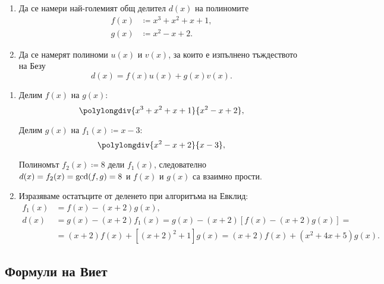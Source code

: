 \documentclass[numbers=endperiod, DIV=15, bibliography=totocnumbered]{scrartcl}
\begin{document}
\begin{exercise}
  \mbox{}
  \begin{enumerate}
    \item Да се намери най-големият общ делител $d(x)$ на полиномите
    \begin{align*}
      f(x) &\coloneqq x^3 + x^2 + x + 1, \\
      g(x) &\coloneqq x^2 - x + 2.
    \end{align*}

    \item Да се намерят полиноми $u(x)$ и $v(x)$, за които е изпълнено тъждеството на Безу
    \begin{displaymath}
      d(x) = f(x) u(x) + g(x) v(x).
    \end{displaymath}
  \end{enumerate}
\end{exercise}
\begin{solution}
  \mbox{}
  \begin{enumerate}
    \item Делим $f(x)$ на $g(x)$:
    \begin{displaymath}
      \polylongdiv {x^3 + x^2 + x + 1} {x^2 - x + 2},
    \end{displaymath}

    Делим $g(x)$ на $f_1(x) \coloneqq x - 3$:
    \begin{displaymath}
      \polylongdiv {x^2 - x + 2} {x - 3},
    \end{displaymath}

    Полиномът $f_2(x) \coloneqq 8$ дели $f_1(x)$, следователно $d(x) = f_2(x) = \operatorname{gcd}(f, g) = 8$ и $f(x)$ и $g(x)$ са взаимно прости.

    \item Изразяваме остатъците от деленето при алгоритъма на Евклид:
    \begin{align*}
      f_1(x)
      &=
      f(x) - (x + 2) g(x),
      \\
      d(x)
      &=
      g(x) - (x + 2) f_1(x)
      =
      g(x) - (x + 2) [f(x) - (x + 2) g(x)]
      = \\ &=
      (x + 2) f(x) + [{(x + 2)}^2 + 1] g(x)
      =
      \boxed{(x + 2) f(x) + (x^2 + 4x + 5) g(x)}.
    \end{align*}
  \end{enumerate}
\end{solution}

\subsection{Формули на Виет}
\end{document}
